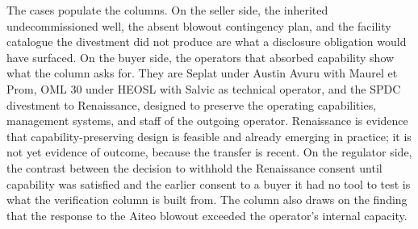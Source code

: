\documentclass[twoside,fontset=lmodern]{mitthesis}
\begin{document}
The cases populate the columns. On the seller side, the inherited
undecommissioned well, the absent blowout contingency plan, and the
facility catalogue the divestment did not produce are what a disclosure
obligation would have surfaced. On the buyer side, the operators that
absorbed capability show what the column asks for. They are Seplat under
Austin Avuru with Maurel et Prom, OML 30 under HEOSL with Salvic as
technical operator, and the SPDC divestment to Renaissance, designed to
preserve the operating capabilities, management systems, and staff of
the outgoing operator. Renaissance is evidence that
capability-preserving design is feasible and already emerging in
practice; it is not yet evidence of outcome, because the transfer is
recent. On the regulator side, the contrast between the decision to
withhold the Renaissance consent until capability was satisfied and the
earlier consent to a buyer it had no tool to test is what the
verification column is built from. The column also draws on the finding
that the response to the Aiteo blowout exceeded the operator's internal
capacity.
\end{document}

